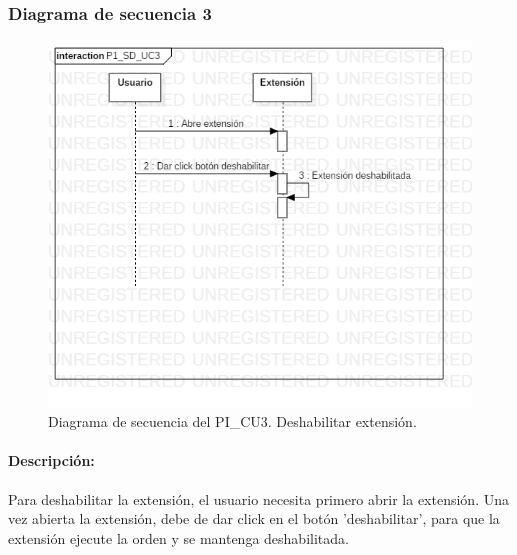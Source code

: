 \documentclass[12pt, a4paper, titlepage]{report}
\begin{document}
			    \subsubsection{Diagrama de secuencia 3}
			    \begin{figure}[H]
				    \begin{center} \includegraphics[width=15cm]{./imagenes/Desarrollo/Prototipo_1/P1_SD_UC3.png}
				    \caption[Diagrama de secuencia 3 del Prototipo I]{Diagrama de secuencia del PI\_CU3. Deshabilitar extensión.}
			        \end{center}
			    \end{figure}
			    
			    \paragraph{Descripción:}
			    Para deshabilitar la extensión, el usuario necesita primero abrir la extensión. Una vez abierta la extensión, debe de dar click en el botón 'deshabilitar', para que la extensión ejecute la orden y se mantenga deshabilitada.
			    
\end{document}
